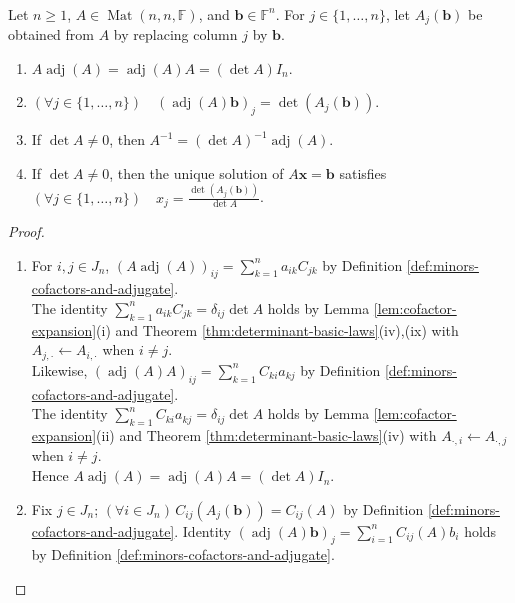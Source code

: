 \begin{theorem} \label{thm:adjugate-identity-and-cramers-rule} \\
Let $n\geq1$, $A\in\operatorname{Mat}(n,n,\mathbb{F})$, and $\mathbf{b}\in\mathbb{F}^n$. For $j\in\{1,\ldots,n\}$, let $A_j(\mathbf{b})$ be obtained from $A$ by replacing column $j$ by $\mathbf{b}$.
\begin{enumerate}[label=(\roman*)]
\setlength{\itemsep}{0pt}
\item $A\operatorname{adj}(A)=\operatorname{adj}(A)A=(\det A)I_n$.
\item $(\forall j\in\{1,\ldots,n\})\quad(\operatorname{adj}(A)\mathbf{b})_j=\det(A_j(\mathbf{b}))$.
\item If $\det A\neq0$, then $A^{-1}=(\det A)^{-1}\operatorname{adj}(A)$.
\item If $\det A\neq0$, then the unique solution of $A\mathbf{x}=\mathbf{b}$ satisfies $(\forall j\in\{1,\ldots,n\})\quad x_j=\frac{\det(A_j(\mathbf{b}))}{\det A}$.
\end{enumerate}
\begin{proof}
\begin{enumerate}[label=(\roman*)]
\setlength{\itemsep}{0pt}
\item For $i,j\in J_n$, $(A\operatorname{adj}(A))_{ij}=\sum\limits_{k=1}^{n}a_{ik}C_{jk}$ by Definition \ref{def:minors-cofactors-and-adjugate}.\\
The identity $\sum\limits_{k=1}^{n}a_{ik}C_{jk}=\delta_{ij}\det A$ holds by Lemma \ref{lem:cofactor-expansion}(i) and Theorem \ref{thm:determinant-basic-laws}(iv),(ix) with $A_{j,\cdot}\leftarrow A_{i,\cdot}$ when $i\neq j$.\\
Likewise, $(\operatorname{adj}(A)A)_{ij}=\sum\limits_{k=1}^{n}C_{ki}a_{kj}$ by Definition \ref{def:minors-cofactors-and-adjugate}.\\
The identity $\sum\limits_{k=1}^{n}C_{ki}a_{kj}=\delta_{ij}\det A$ holds by Lemma \ref{lem:cofactor-expansion}(ii) and Theorem \ref{thm:determinant-basic-laws}(iv) with $A_{\cdot,i}\leftarrow A_{\cdot,j}$ when $i\neq j$.\\
Hence $A\operatorname{adj}(A)=\operatorname{adj}(A)A=(\det A)I_n$.
\item Fix $j\in J_n$; $(\forall i\in J_n)\,C_{ij}(A_j(\mathbf{b}))=C_{ij}(A)$ by Definition \ref{def:minors-cofactors-and-adjugate}. Identity $(\operatorname{adj}(A)\mathbf{b})_j=\sum\limits_{i=1}^{n}C_{ij}(A)b_i$ holds by Definition \ref{def:minors-cofactors-and-adjugate}.\\

\end{enumerate}
\end{proof}
\end{theorem}
